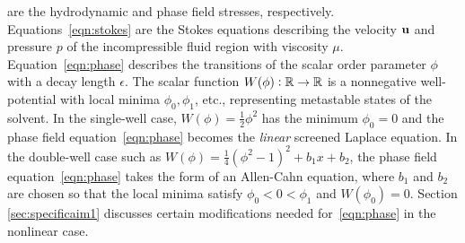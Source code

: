 are the hydrodynamic and phase field stresses, respectively.
Equations~\eqref{eqn:stokes} are the Stokes equations describing the
velocity $\mathbf{u}$ and pressure $p$ of the incompressible fluid region with
viscosity $\mu$. Equation~\eqref{eqn:phase} describes the transitions
of the scalar order parameter $\phi$ with a decay length $\epsilon$.
The scalar function $W(\phi) : \mathbb{R} \to \mathbb{R}$ is a nonnegative
well-potential with local minima $\phi_0, \phi_1$, etc., representing
metastable states of the solvent. In the single-well case, $W(\phi) =
\frac{1}{2}\phi^2$ has the minimum $\phi_0 = 0$ and the phase field
equation~\eqref{eqn:phase} becomes the \emph{linear} screened Laplace
equation. In the double-well case such as $W(\phi) =
\frac{1}{4}(\phi^2-1)^2+b_1 x + b_2$, the phase field
equation~\eqref{eqn:phase} takes the form of an Allen-Cahn equation,
where $b_1$ and $b_2$ are chosen so that the local minima satisfy
$\phi_0 < 0 < \phi_1$ and $W(\phi_0) = 0$. Section
\ref{sec:specificaim1} discusses certain modifications needed
for~\eqref{eqn:phase} in the nonlinear case.

